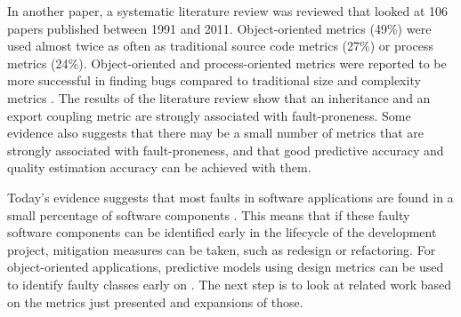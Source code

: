 In another paper, a systematic literature review was reviewed that looked at 106 papers published between 1991 and 2011.
Object-oriented metrics (49\%) were used almost twice as often as traditional source code metrics (27\%) or process metrics (24\%). Object-oriented and process-oriented metrics were reported to be more successful in finding bugs compared to traditional size and complexity metrics \cite{b7radjenovic2013software}. The results of the literature review show that an inheritance and an export coupling metric are strongly associated with fault-proneness. Some evidence also suggests that there may be a small number of metrics that are strongly associated with fault-proneness, and that good predictive accuracy and quality estimation accuracy can be achieved with them.

Today's evidence suggests that most faults in software applications are found in a small percentage of software components \cite{b10el2001prediction}. This means that if these faulty software components can be identified early in the lifecycle of the development project, mitigation measures can be taken, such as redesign or refactoring. For object-oriented applications, predictive models using design metrics can be used to identify faulty classes early on \cite{b10el2001prediction}. The next step is to look at related work based on the metrics just presented and expansions of those. 

